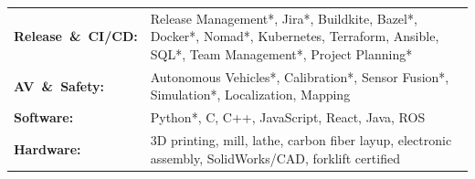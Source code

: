 {\raggedright{}
\noindent
\begin{tabular}{@{}>{\bfseries}p{3.7cm}>{\raggedright\arraybackslash}p{\dimexpr\textwidth-3.7cm-2\tabcolsep\relax}@{}}
\mbox{Release \& CI/CD:} & Release Management*, Jira*, Buildkite, Bazel*, Docker*, Nomad*, Kubernetes, Terraform, Ansible, SQL*, Team Management*, Project Planning* \\[0.28em]
\mbox{AV \& Safety:} & Autonomous Vehicles*, Calibration*, Sensor Fusion*, Simulation*, Localization, Mapping \\[0.28em]
Software: & Python*, C, C++, JavaScript, React, Java, ROS \\[0.28em]
Hardware: & 3D printing, mill, lathe, carbon fiber layup, electronic assembly, SolidWorks/CAD, forklift certified \\
\end{tabular}
\par\vspace{0.05em}{\hfill\scriptsize *Used in current role}\par
}
%
%
